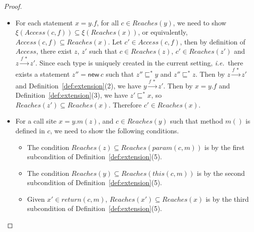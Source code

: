 \documentclass{fac}
\newcommand\ie{\textit{i.e.\ }}
\newcommand{\keyword}[1]{\mathsf{#1}}
\newcommand{\kwnew}[0]{\keyword{new}}
\newcommand{\less}{\sqsubseteq}
\newcommand{\hflow}{\longrightarrow}
\newcommand{\lhflow}[1]{\stackrel{#1}{\hflow}}
\begin{document}
\begin{proof}
\begin{itemize}
\item For each statement $x = y.f$, for all $c\in Reaches(y)$, we need to show $\xi(Access(c,f))\subseteq\xi(Reaches(x))$, or equivalently, $Access(c,f)\subseteq Reaches(x)$. Let $c'\in Access(c,f)$, then by definition of $Access$, there exist $z$, $z'$ such that $c\in Reaches(z)$, $c'\in Reaches(z')$ and $z\lhflow{f\ *}z'$.
    Since each type is uniquely created in the current setting, \ie there exists a statement $z''= \kwnew\ c$ such that $z''\less^* y$ and $z''\less^* z$. Then by $z\lhflow{f\ *}z'$ and Definition~\ref{def:extension}(2), we have $y\lhflow{f\ *}z'$. Then by $x = y.f$ and Definition~\ref{def:extension}(3), we have $z'\less^*x$, so $Reaches(z')\subseteq Reaches(x)$. Therefore $c'\in Reaches(x)$.

\item For a call site $x = y.m(z)$, and $c\in Reaches(y)$ such that method $m()$ is defined in $c$, we need to show the following conditions.
      \begin{itemize}
      \item The condition $Reaches(z)\subseteq Reaches(param(c,m))$ is by the first subcondition of Definition~\ref{def:extension}(5).
      \item The condition $Reaches(y)\subseteq Reaches(this(c,m))$ is by the second subcondition of Definition~\ref{def:extension}(5).
      \item Given $x'\in return(c,m)$, $Reaches(x')\subseteq Reaches(x)$ is by the third subcondition of Definition~\ref{def:extension}(5).
      \end{itemize}
\end{itemize}

\medskip


\end{proof}
\end{document}
